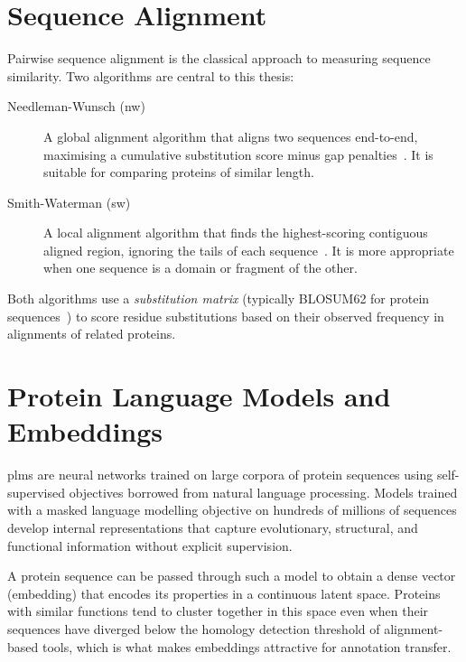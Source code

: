 \section{Sequence Alignment}
\label{sec:alignment}

Pairwise sequence alignment is the classical approach to measuring sequence
similarity. Two algorithms are central to this thesis:

\begin{description}
  \item[Needleman-Wunsch (\gls{nw})] A global alignment algorithm that aligns
    two sequences end-to-end, maximising a cumulative substitution score minus
    gap penalties~\cite{needleman1970general}. It is suitable for comparing
    proteins of similar length.
  \item[Smith-Waterman (\gls{sw})] A local alignment algorithm that finds the
    highest-scoring contiguous aligned region, ignoring the tails of each
    sequence~\cite{smith1981identification}. It is more appropriate when one
    sequence is a domain or fragment of the other.
\end{description}

Both algorithms use a \textit{substitution matrix} (typically BLOSUM62 for
protein sequences~\cite{henikoff1992amino}) to score residue substitutions
based on their observed frequency in alignments of related proteins.

\section{Protein Language Models and Embeddings}
\label{sec:plm}

\Glspl{plm} are neural networks trained on large corpora of protein sequences
using self-supervised objectives borrowed from natural language processing.
Models trained with a masked language modelling objective on hundreds of
millions of sequences develop internal representations that capture
evolutionary, structural, and functional information without explicit
supervision.

A protein sequence can be passed through such a model to obtain a dense vector
(embedding) that encodes its properties in a continuous latent space. Proteins
with similar functions tend to cluster together in this space even when their
sequences have diverged below the homology detection threshold of
alignment-based tools, which is what makes embeddings attractive for annotation
transfer.

